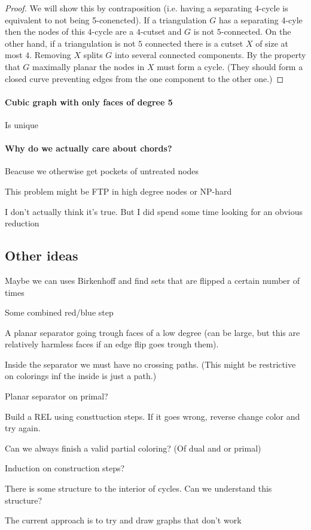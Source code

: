   \begin{proof}
  We will show this by contraposition (i.e. having a separating 4-cycle is equivalent to not being 5-conencted).
  If a triangulation $G$ has a separating 4-cyle then the nodes of this $4$-cycle are a $4$-cutset and $G$ is not $5$-connected.
  On the other hand, if a triangulation is not $5$ connected there is a cutset $X$ of size at most $4$. Removing $X$ splits $G$ into several connected components. By the property that $G$ maximally planar the nodes in $X$ must form a cycle. (They should form a closed curve preventing edges from the one component to the other one.)
  \end{proof}


  \paragraph{Cubic graph with only faces of degree 5}
  Is unique

  \paragraph{Why do we actually care about chords?}
  Beacuse we otherwise get pockets of untreated nodes

  \begin{con}
    This problem might be FTP in high degree nodes or NP-hard
  \end{con}
    I don't actually think it's true. But I did spend some time looking for an obvious reduction


    \subsection{Other ideas}
    Maybe we can uses Birkenhoff and find sets that are flipped a certain number of times

    Some combined red/blue step

    A planar separator going trough faces of a low degree (can be large, but this are relatively harmless faces if an edge flip goes trough them).

    Inside the separator we must have no crossing paths. (This might be restrictive on colorings inf the inside is just a path.)

    Planar separator on primal?


    Build a REL using consttuction steps. If it goes wrong, reverse change color and try again.

    Can we always finish a valid partial coloring? (Of dual and or primal)


    Induction on construction steps?

    There is some structure to the interior of cycles. Can we understand this structure?

    The current approach is to try and draw graphs that don't work

\printbibliography

